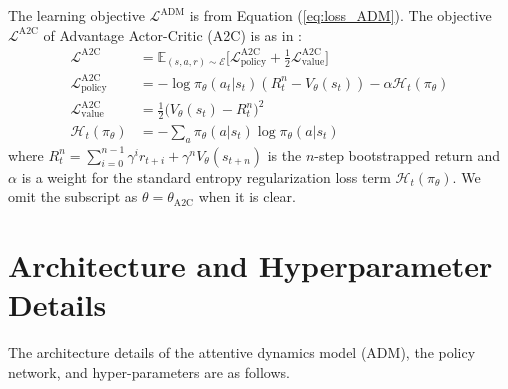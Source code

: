\documentclass{article} \usepackage{iclr,times}
\begin{document}
{The learning objective $\mathcal L^\text{ADM}$ is from Equation (\ref{eq:loss_ADM}).
The objective $\mathcal L^\text{A2C}$ of Advantage Actor-Critic (A2C) is as in \citep{Mnih:ICML2016:A3C,Dhariwal:2017:baselines}:
\begin{align}
    \label{eq:a2c_loss}
    \mathcal L^\text{A2C} &=
        \mathbb E_{(s,a,r) \sim \mathcal{E}} \bigg[
                \mathcal L^\text{A2C}_\text{policy} + \frac{1}{2} \mathcal L^\text{A2C}_\text{value}
            \bigg]
    \\
    \label{eq:a2c_policy}
    \mathcal L^\text{A2C}_\text{policy} &=
    - \log \pi_{\theta}(a_t | s_t) (R_t^{n} - V_\theta (s_t)) - \alpha \mathcal{H}_t (\pi_\theta)
    \\
    \label{eq:a2c_value}
    \mathcal L^\text{A2C}_\text{value} &=
    \frac{1}{2} \Big( V_\theta (s_t) - R_t^{n} \Big)^2
    \\
    \label{eq:a2c_entropy}
    \mathcal{H}_t (\pi_\theta) &=
    - \textstyle \sum_{a} \pi_\theta(a|s_t) \log \pi_\theta(a | s_t)
\end{align}
where $R_t^{n} = \sum_{i=0}^{n-1} \gamma^i r_{t+i} + \gamma^n V_\theta (s_{t+n})$ is the $n$-step bootstrapped return and $\alpha$ is a weight for the standard entropy regularization loss term $\mathcal H_t(\pi_\theta)$.
We omit the subscript as $\theta = \theta_\text{A2C}$ when it is clear.


\clearpage





\section{Architecture and Hyperparameter Details}
\label{sec:hyperparam_details}

The architecture details of the attentive dynamics model (ADM), the policy network, and hyper-parameters are as follows.

\renewcommand{\arraystretch}{1.4}


}
\end{document}

